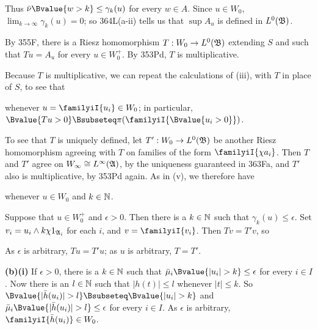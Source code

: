 {

\noindent Thus $\bar\nu\Bvalue{w>k}\le\gamma_k(u)$ for every $w\in A$.
Since $u\in W_0$, $\lim_{k\to\infty}\gamma_k(u)=0$;  so 364L(a-ii)
tells us that $\sup A_u$ is defined in $L^0(\frak B)$.\ \QeD\

By 355F, there is a Riesz homomorphism $T:W_0\to L^0(\frak B)$
extending $S$ and such that $Tu=A_u$ for every
$u\in W_0^+$.   By 353Pd, $T$ is multiplicative.

\medskip

 Because $T$ is multiplicative, we can repeat the
calculations of (iii), with $T$ in place of $S$, to see that


\noindent whenever $u=\familyiI{u_i}\in W_0$;  in particular,
$\Bvalue{Tu>0}\Bsubseteq\pi(\familyiI{\Bvalue{u_i>0}})$.

\medskip

 To see that $T$ is uniquely defined, let
$T':W_0\to L^0(\frak B)$ be another Riesz homomorphism agreeing with $T$ on
families of the form $\familyiI{\chi a_i}$.
Then $T$ and $T'$ agree on $W_{\infty}\cong L^{\infty}(\frak A)$,
by the uniqueness guaranteed in
363Fa, and $T'$ also is multiplicative, by 353Pd again.   As in (v), we
therefore have


\noindent whenever $u\in W_0$ and $k\in\Bbb N$.

Suppose that $u\in W_0^+$ and $\epsilon>0$.   Then there is a
$k\in\Bbb N$ such that $\gamma_k(u)\le\epsilon$.   Set
$v_i=u_i\wedge k\chi 1_{\frak A_i}$ for each $i$, and
$v=\familyiI{v_i}$.   Then $Tv=T'v$, so


\noindent As $\epsilon$ is arbitrary,
$Tu=T'u$;  as $u$ is arbitrary, $T=T'$.

\medskip

{\bf (b)(i)} If $\epsilon>0$, there is a $k\in\Bbb N$ such that
$\bar\mu_i\Bvalue{|u_i|>k}\le\epsilon$ for every $i\in I$.   Now there is
an $l\in\Bbb N$ such that $|h(t)|\le l$ whenever $|t|\le k$.   So
$\Bvalue{|\bar h(u_i)|>l}\Bsubseteq\Bvalue{|u_i|>k}$ and
$\bar\mu_i\Bvalue{|\bar h(u_i)|>l}\le\epsilon$ for every $i\in I$.
As $\epsilon$ is arbitrary, $\familyiI{\bar h(u_i)}\in W_0$.

}
